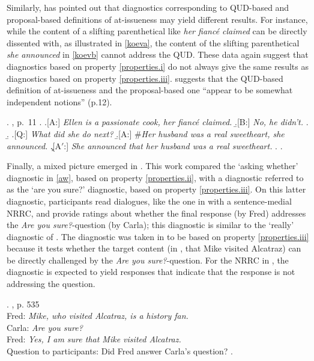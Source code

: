\documentclass[times,linguex]{glossa}
\begin{document}
Similarly, \citet{koev_notions_2018} has pointed out that diagnostics corresponding to QUD-based and proposal-based definitions of at-issueness may yield different results. For instance, while the content of a slifting parenthetical like \emph{her fianc\'e claimed} can be directly dissented with, as illustrated in \ref{koeva}, the content of the slifting parenthetical \emph{she announced} in \ref{koevb} cannot address the QUD. These data again suggest that diagnostics based on property \ref{properties.i} do not always give the same results as diagnostics based on property \ref{properties.iii}. \citealt{koev_notions_2018} suggests that the QUD-based definition of at-issueness and the proposal-based one ``appear to be somewhat independent notions''  (p.12).

\ex.\label{koev} \citealt{koev_notions_2018}, p.~11
\a.\label{koeva} 
\a.[A:] \emph{Ellen is a passionate cook, her fianc\'e claimed.}
\b.[B:] \emph{No, he didn't.}
\z.
\b.\label{koevb}
\a.[Q:] \emph{What did she do next?}
\b.[A:] \#\emph{Her husband was a real sweetheart, she announced.}
\c.[A$'$:] \emph{She announced that her husband was a real sweetheart.}
\z. \z.


Finally, a mixed picture emerged in \citealt{tonhauser_how_2018}. This work compared the `asking whether' diagnostic in \ref{aw}, based on property \ref{properties.ii}, with a diagnostic referred to as the `are you sure?' diagnostic,  based on property \ref{properties.iii}. On this latter diagnostic, participants read dialogues, like the one in \Next with a sentence-medial NRRC, and provide ratings about whether the final response (by Fred) addresses the {\em Are you sure?}-question (by Carla); this diagnostic is similar to the `really' diagnostic of \citealt{shanon_two_1976}. The diagnostic was taken in \citealt[519]{tonhauser_how_2018} to be based on property \ref{properties.iii} because it tests whether the target content (in \Next, that Mike visited Alcatraz) can be directly challenged by the \emph{Are you sure?}-question. For the NRRC  in \Next, the diagnostic is expected to yield responses that indicate that the response is not addressing the question.

\ex. \citealt{tonhauser_how_2018}, p. 535\\
Fred: \emph{Mike, who visited Alcatraz, is a history fan.}\\
Carla: \emph{Are you sure?}\\
Fred: \emph{Yes, I am sure that Mike visited Alcatraz.}\\
Question to participants: Did Fred answer Carla's question?
\z.
\end{document}
